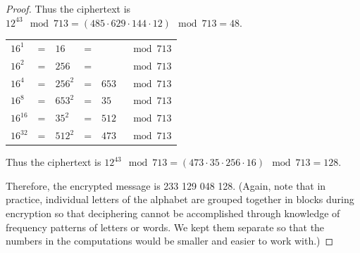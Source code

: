 \documentclass[14pt]{extarticle}
\begin{document}
\begin{proof}
        Thus the ciphertext is \(12^{43} \mod 713 = (485 \cdot 629 \cdot 144 \cdot 12) \mod 713 = 48\).

        \begin{tabular}{lclcll}
                \(16^1\)    & = & \(16\)    & = & \(\)    & \(\mod 713\) \\
                \(16^2\)    & = & \(256\)   & = & \(\)    & \(\mod 713\) \\
                \(16^4\)    & = & \(256^2\) & = & \(653\) & \(\mod 713\) \\
                \(16^8\)    & = & \(653^2\) & = & \(35\)  & \(\mod 713\) \\
                \(16^{16}\) & = & \(35^2\)  & = & \(512\) & \(\mod 713\) \\
                \(16^{32}\) & = & \(512^2\) & = & \(473\) & \(\mod 713\)
        \end{tabular}

        Thus the ciphertext is \(12^{43} \mod 713 = (473 \cdot 35 \cdot 256 \cdot 16) \mod 713 = 128\).

        Therefore, the encrypted message is 233 129 048 128. (Again, note that in practice, individual letters of the
        alphabet are grouped together in blocks during encryption so that deciphering cannot be accomplished through
        knowledge of frequency patterns of letters or words. We kept them separate so that the numbers in the computations
        would be smaller and easier to work with.)
\end{proof}
\end{document}

